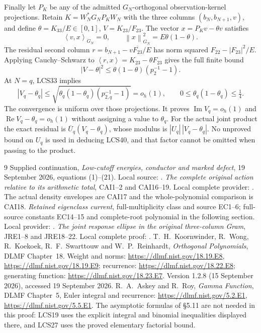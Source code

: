 \documentclass[11pt]{article}
\newcommand{\norm}[1]{\left\lVert#1\right\rVert}
\newcommand{\ip}[2]{\left\langle#1,#2\right\rangle}
\begin{document}
Finally let $P_K$ be any of the admitted $G_N$-orthogonal
observation-kernel projections. Retain
$K=W_N^*G_NP_KW_N$ with the three columns
$(b_N,b_{N+1},v)$, and define
$\theta=K_{33}/E\in[0,1]$, $V=K_{23}/F_{23}$.
The vector $x=P_Kv-\theta v$ satisfies
\[
 \ip v x_{G_N}=0,\qquad\norm x_{G_N}^2=E\theta(1-\theta).
\]
The residual second column
$r=b_{N+1}-v\overline{F_{23}}/E$ has norm squared
$F_{22}-|F_{23}|^2/E$. Applying Cauchy--Schwarz to
$\ip r x=K_{23}-\theta F_{23}$ gives the full finite bound
\begin{equation}\tag{LCS39}
 \boxed{|V-\theta|^2\le\theta(1-\theta)(p_2^{-1}-1).}
\end{equation}
At $N=q$, LCS33 implies
\begin{equation}\tag{LCS40}
 |V_q-\theta_q|\le
 \sqrt{\theta_q(1-\theta_q)(p_{2,q}^{-1}-1)}=o_h(1),
 \qquad 0\le\theta_q(1-\theta_q)\le\tfrac14.
\end{equation}
The convergence is uniform over those projections. It proves
$\operatorname{Im}V_q=o_h(1)$ and
$\operatorname{Re}V_q-\theta_q=o_h(1)$ without assigning a value
to $\theta_q$. For the actual joint product the exact residual is
$\overline U_q(V_q-\theta_q)$, whose modulus is
$|U_q|\,|V_q-\theta_q|$. No unproved bound on $U_q$ is used in
deducing LCS40, and that factor cannot be omitted when passing
to the product.

\begin{thebibliography}{9}
 Supplied continuation,
\emph{Low-cutoff energies, conductor and marked defect},
19 September 2026, equations (1)--(21).
Local source: .
 \emph{The complete original action relative to its
arithmetic total}, CAI1--2 and CAI16--19. Local complete provider:
.
The actual density envelopes are CAI17 and the whole-polynomial
comparison is CAI18.
 \emph{Retained eigenclass current}, full-multiplicity
class and source EC1--6; full-source constants EC14--15 and
complete-root polynomial in the following section. Local provider:
.
 \emph{The joint response ellipse in the original
three-column Gram}, JRE1--8 and JRE18--22. Local complete proof:
.
 T.~H.~Koornwinder, R.~Wong, R.~Koekoek,
R.~F.~Swarttouw and W.~P.~Reinhardt,
\emph{Orthogonal Polynomials}, DLMF Chapter~18.
Weight and norms: \url{https://dlmf.nist.gov/18.19.E8},
\url{https://dlmf.nist.gov/18.19.E9}; recurrence:
\url{https://dlmf.nist.gov/18.22.E8}; generating function:
\url{https://dlmf.nist.gov/18.23.E7}.
Version 1.2.8 (15 September 2026), accessed 19 September 2026.
 R.~A.~Askey and R.~Roy,
\emph{Gamma Function}, DLMF Chapter~5, Euler integral and recurrence:
\url{https://dlmf.nist.gov/5.2.E1},
\url{https://dlmf.nist.gov/5.5.E1}.
The asymptotic formulas of \S5.11 are not needed in this proof:
LCS19 uses the explicit integral and binomial inequalities displayed
there, and LCS27 uses the proved elementary factorial bound.
\end{thebibliography}
\end{document}

